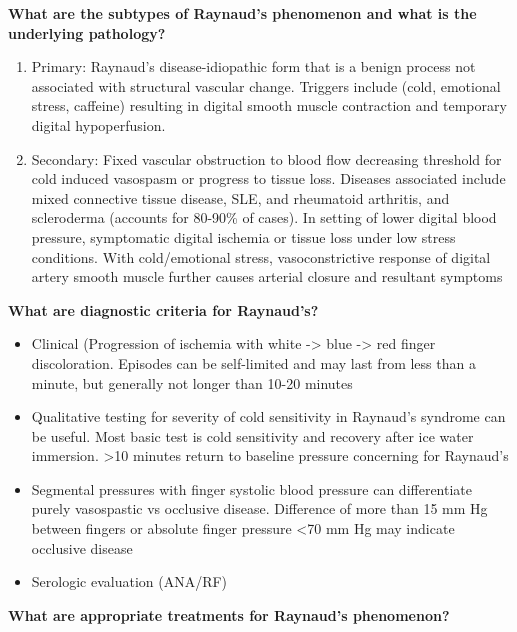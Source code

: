 \documentclass[
]{book}
\begin{document}
\textbf{What are the subtypes of Raynaud's phenomenon and what is the
underlying pathology?}

\begin{enumerate}
\def\labelenumi{\arabic{enumi}.}
\item
  Primary: Raynaud's disease-idiopathic form that is a benign process
  not associated with structural vascular change. Triggers include
  (cold, emotional stress, caffeine) resulting in digital smooth
  muscle contraction and temporary digital hypoperfusion.
\item
  Secondary: Fixed vascular obstruction to blood flow decreasing
  threshold for cold induced vasospasm or progress to tissue loss.
  Diseases associated include mixed connective tissue disease, SLE,
  and rheumatoid arthritis, and scleroderma (accounts for 80-90\% of
  cases). In setting of lower digital blood pressure, symptomatic
  digital ischemia or tissue loss under low stress conditions. With
  cold/emotional stress, vasoconstrictive response of digital artery
  smooth muscle further causes arterial closure and resultant symptoms
\end{enumerate}

\textbf{What are diagnostic criteria for Raynaud's?}

\begin{itemize}
\item
  Clinical (Progression of ischemia with white -\textgreater{} blue -\textgreater{} red finger
  discoloration. Episodes can be self-limited and may last from less
  than a minute, but generally not longer than 10-20 minutes
\item
  Qualitative testing for severity of cold sensitivity in Raynaud's
  syndrome can be useful. Most basic test is cold sensitivity and
  recovery after ice water immersion. \textgreater10 minutes return to baseline
  pressure concerning for Raynaud's
\item
  Segmental pressures with finger systolic blood pressure can
  differentiate purely vasospastic vs occlusive disease. Difference of
  more than 15 mm Hg between fingers or absolute finger pressure \textless70
  mm Hg may indicate occlusive disease
\item
  Serologic evaluation (ANA/RF)
\end{itemize}

\textbf{What are appropriate treatments for Raynaud's phenomenon?}
\end{document}

